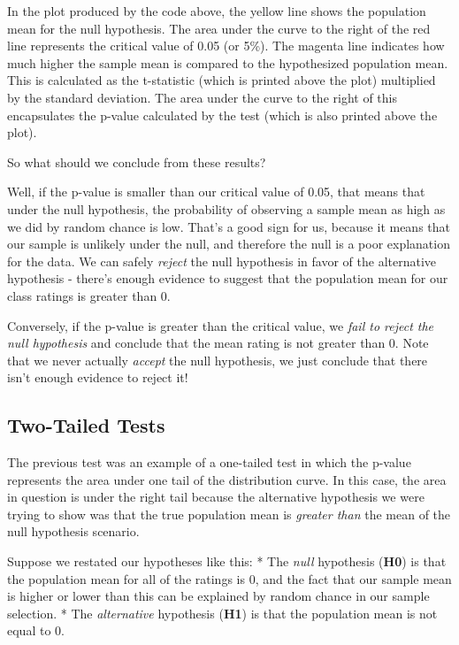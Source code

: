 \documentclass[11pt]{article}
\begin{document}
    In the plot produced by the code above, the yellow line shows the
population mean for the null hypothesis. The area under the curve to the
right of the red line represents the critical value of 0.05 (or 5\%).
The magenta line indicates how much higher the sample mean is compared
to the hypothesized population mean. This is calculated as the
t-statistic (which is printed above the plot) multiplied by the standard
deviation. The area under the curve to the right of this encapsulates
the p-value calculated by the test (which is also printed above the
plot).

So what should we conclude from these results?

Well, if the p-value is smaller than our critical value of 0.05, that
means that under the null hypothesis, the probability of observing a
sample mean as high as we did by random chance is low. That's a good
sign for us, because it means that our sample is unlikely under the
null, and therefore the null is a poor explanation for the data. We can
safely \emph{reject} the null hypothesis in favor of the alternative
hypothesis - there's enough evidence to suggest that the population mean
for our class ratings is greater than 0.

Conversely, if the p-value is greater than the critical value, we
\emph{fail to reject the null hypothesis} and conclude that the mean
rating is not greater than 0. Note that we never actually \emph{accept}
the null hypothesis, we just conclude that there isn't enough evidence
to reject it!

    \subsection{Two-Tailed Tests}\label{two-tailed-tests}

The previous test was an example of a one-tailed test in which the
p-value represents the area under one tail of the distribution curve. In
this case, the area in question is under the right tail because the
alternative hypothesis we were trying to show was that the true
population mean is \emph{greater than} the mean of the null hypothesis
scenario.

Suppose we restated our hypotheses like this: * The \emph{null}
hypothesis (\textbf{H0}) is that the population mean for all of the
ratings is 0, and the fact that our sample mean is higher or lower than
this can be explained by random chance in our sample selection. * The
\emph{alternative} hypothesis (\textbf{H1}) is that the population mean
is not equal to 0.
\end{document}
